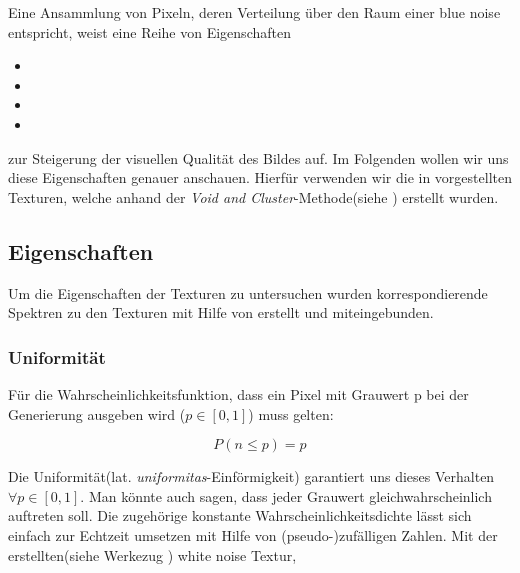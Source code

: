 Eine Ansammlung von Pixeln, deren Verteilung über den Raum einer blue noise entspricht, 
weist eine Reihe von Eigenschaften

\begin{itemize}

    \item {}
    \item {}
    \item {}
    \item {}

\end{itemize}

zur Steigerung der visuellen Qualität des Bildes auf. \cite{3288}
Im Folgenden wollen wir uns diese Eigenschaften genauer anschauen.
Hierfür verwenden wir die in \cite{Pet17} vorgestellten Texturen, welche anhand der
\textit{Void and Cluster}-Methode(siehe \cite{ulichney1993void}) erstellt wurden.

\subsection{Eigenschaften}

Um die Eigenschaften der Texturen zu untersuchen wurden korrespondierende Spektren zu den Texturen mit Hilfe von 
\cite{JCrystalSoft2018} erstellt und miteingebunden.

\subsubsection{Uniformität}
\label{ch:Content1:sec:blue noise:Uniformität}

Für die Wahrscheinlichkeitsfunktion, dass
ein Pixel mit Grauwert p bei der Generierung ausgeben wird  ($\textit{p} \in [0,1]$) muss gelten: 

\begin{equation}\label{eq:Uniformitätsgleichung}
    P(n \leq p) = p
\end{equation}

Die Uniformität(lat. \textit{uniformitas}-Einförmigkeit) garantiert uns dieses
Verhalten $\forall p \in [0,1]$. Man könnte auch sagen, dass jeder Grauwert gleichwahrscheinlich
auftreten soll. Die zugehörige konstante Wahrscheinlichkeitsdichte
lässt sich einfach zur Echtzeit umsetzen mit Hilfe von (pseudo-)zufälligen Zahlen.
Mit der erstellten(siehe Werkezug \cite{WhiteNoiseGenerator}) white noise Textur,

